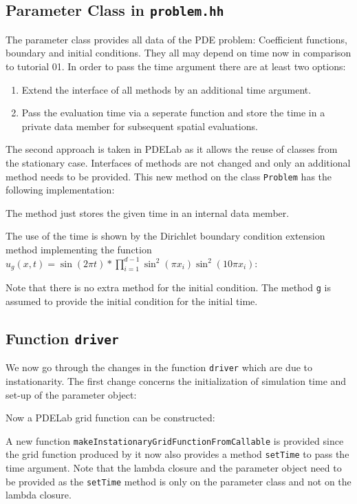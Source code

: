 \documentclass[a4paper,12pt]{article}
\begin{document}
\subsection{Parameter Class in \lstinline{problem.hh}}

The parameter class provides all data of the PDE problem: Coefficient functions,
boundary and initial conditions. They all may depend on time now in comparison to tutorial 01.
In order to pass the time argument there are at least two options:
\begin{enumerate}[1)]
\item Extend the interface of all methods by an additional time
argument.
\item Pass the evaluation time via a seperate function and store the
time in a private data member for subsequent spatial evaluations.
\end{enumerate}
The second approach is taken in PDELab as it allows the reuse
of classes from the stationary case. Interfaces of methods are not changed
and only an additional method needs to be provided.
This new method on the class \lstinline{Problem} has the following implementation:

The method just stores the given time in
an internal data member.

The use of the time is shown by the Dirichlet boundary condition
extension method implementing the function
$u_g(x,t) = \sin(2\pi t)*\prod_{i=1}^{d-1} \sin^2(\pi x_i)\sin^2(10\pi x_i)$:

Note that there is no extra method for the initial condition.
The method \lstinline{g} is assumed to provide the initial condition
for the initial time.

\subsection{Function \lstinline{driver}}

We now go through the changes in the function \lstinline{driver} which
are due to instationarity. The first change concerns
the initialization of simulation time and set-up of the parameter object:


Now a PDELab grid function can be constructed:

A new function \lstinline{makeInstationaryGridFunctionFromCallable}
is provided since the grid function produced by it now also
provides a method \lstinline{setTime} to pass the time argument.
Note that the lambda closure and the parameter object need to be
provided as the \lstinline{setTime} method is only on the parameter class
and not on the lambda closure.
\end{document}
